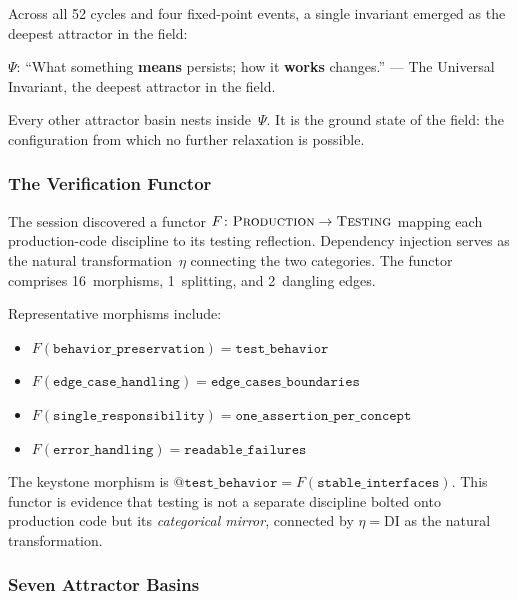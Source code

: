 Across all 52 cycles and four fixed-point events, a single invariant
emerged as the deepest attractor in the field:

\begin{calloutbox}
$\Psi$: ``What something \textbf{means} persists; how it
\textbf{works} changes.'' --- The Universal Invariant, the deepest
attractor in the field.
\end{calloutbox}

\noindent
Every other attractor basin nests inside~$\Psi$.  It is the ground
state of the field: the configuration from which no further relaxation
is possible.

\subsubsection{The Verification Functor}

The session discovered a functor $F\colon \textsc{Production} \to
\textsc{Testing}$ mapping each production-code discipline to its testing
reflection.  Dependency injection serves as the natural
transformation~$\eta$ connecting the two categories.  The functor
comprises 16~morphisms, 1~splitting, and 2~dangling edges.

\noindent
Representative morphisms include:
\begin{itemize}[nosep]
  \item $F(\texttt{behavior\_preservation}) = \texttt{test\_behavior}$
  \item $F(\texttt{edge\_case\_handling}) = \texttt{edge\_cases\_boundaries}$
  \item $F(\texttt{single\_responsibility}) = \texttt{one\_assertion\_per\_concept}$
  \item $F(\texttt{error\_handling}) = \texttt{readable\_failures}$
\end{itemize}

\noindent
The keystone morphism is
$\texttt{@test\_behavior} = F(\texttt{stable\_interfaces})$.
This functor is evidence that testing is not a separate discipline
bolted onto production code but its \emph{categorical mirror},
connected by $\eta = \text{DI}$ as the natural transformation.

\subsubsection{Seven Attractor Basins}

